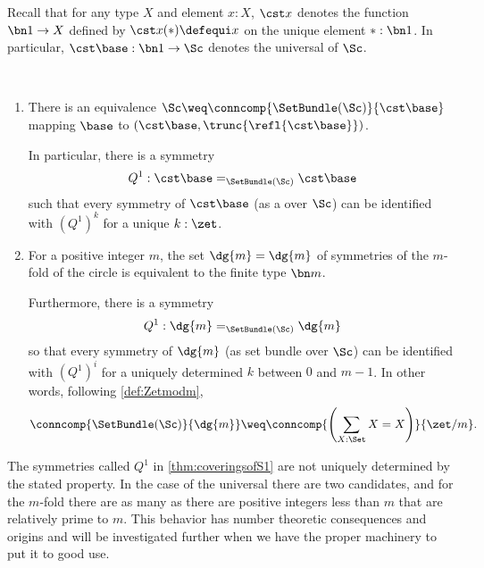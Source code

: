 Recall that for any type $X$ and element $x:X$, $\cst x$ denotes the
function $\bn 1\to X$ defined by $\cst x (\ast) \defequi x$ on the
unique element $\ast: \bn 1$. In particular,
$\cst \base : \bn 1 \to \Sc$ denotes the universal \covering of $\Sc$.

\begin{theorem}~%
  \label{thm:coveringsofS1}
  \begin{enumerate}
  \item \label{item:univ-cover-Sc-Z}%
    There is an equivalence
    $\Sc \weq \conncomp {\SetBundle(\Sc)} {\cst \base}$ mapping
    $\base$ to $(\cst \base, \trunc{\refl {\cst \base}})$.

    In particular, there is a symmetry
    \[
      Q^1:\cst\base=_{\SetBundle(\Sc)}\cst\base
    \]
    such that every symmetry of $\cst\base$
    (as a \covering over $\Sc$)
    can be identified with $(Q^1)^k$ for a unique $k:\zet$.

  \item \label{item:setbundle-mcover}%
    For a positive integer $m$, the set
    $\dg{m}=\dg{m}$ of symmetries of the
    $m$-fold \covering of the circle is equivalent to the finite type
    $\bn m$.

    Furthermore, there is a symmetry
    \begin{displaymath}
      Q^1:\dg{m}=_{\SetBundle(\Sc)}\dg{m}
    \end{displaymath}
    so that every symmetry of $\dg{m}$ (as set bundle over
    $\Sc$) can be identified with $(Q^1)^i$ for a uniquely determined $k$ between
    $0$ and $m-1$. In other words, following \cref{def:Zetmodm},
    \begin{displaymath}
      \conncomp{\SetBundle(\Sc)}{\dg{m}} \weq \conncomp{\left(\sum_{X:\Set}X=X\right)}{\zet/m}.
    \end{displaymath}

  \end{enumerate}
 \end{theorem}
\begin{remark}\label{rem:thenonuniquenessofgeneratorsofmodulararithmetic1}
  The symmetries called $Q^1$ in \cref{thm:coveringsofS1} are not
  uniquely determined by the stated property.  In the case of the
  universal \covering there are two candidates, and for the $m$-fold
  \covering there are as many as there are positive integers less than
  $m$ that are relatively prime to $m$.  This behavior has number theoretic
  consequences and origins and will be investigated further when we
  have the proper machinery to put it to good use.
\end{remark}


